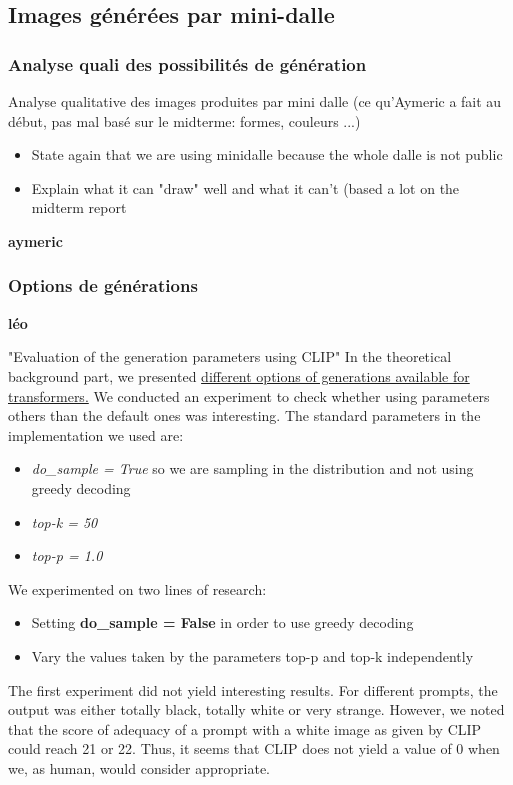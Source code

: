 \documentclass{article}
\begin{document}
\subsection{Images générées par mini-dalle}

\subsubsection{Analyse quali des possibilités de génération}
Analyse qualitative des images produites par mini dalle (ce qu'Aymeric a fait au début, pas mal basé sur le midterme: formes, couleurs ...)

\begin{itemize}
    \item State again that we are using minidalle because the whole dalle is not public
    \item Explain what it can "draw" well and what it can't (based a lot on the midterm report
\end{itemize}
\textbf{aymeric}

\subsubsection{Options de générations}
\textbf{léo}

"Evaluation of the generation parameters using CLIP"
In the theoretical background part, we presented \hyperlink{options-generation}{different options of generations available for transformers.} We conducted an experiment to check whether using parameters others than the default ones was interesting. The standard parameters in the implementation we used are:
\begin{itemize}
    \item \textit{do\_sample = True} so we are sampling in the distribution and not using greedy decoding
    \item \textit{top-k = 50}
    \item \textit{top-p = 1.0}
\end{itemize}

We experimented on two lines of research:
\begin{itemize}
    \item Setting \textbf{do\_sample = False} in order to use greedy decoding
    \item Vary the values taken by the parameters top-p and top-k independently
\end{itemize}

The first experiment did not yield interesting results. For different prompts, the output was either totally black, totally white or very strange. However, we noted that the score of adequacy of a prompt with a white image as given by CLIP could reach 21 or 22. Thus, it seems that CLIP does not yield a value of 0 when we, as human, would consider appropriate. 
\end{document}

